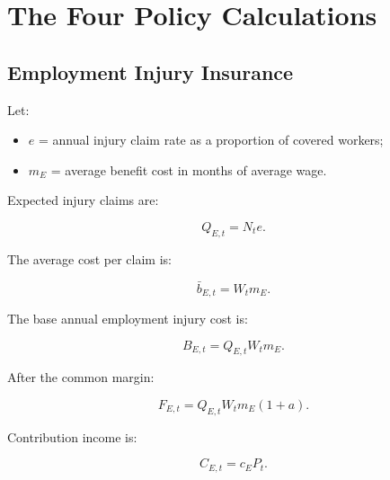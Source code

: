 \section{The Four Policy Calculations}

\subsection{Employment Injury Insurance}


Let:

\begin{itemize}
  \item $e$ = annual injury claim rate as a proportion of covered workers;
  \item $m_E$ = average benefit cost in months of average wage.
\end{itemize}

Expected injury claims are:

\begin{equation}
Q_{E,t}=N_te.
\end{equation}

The average cost per claim is:

\begin{equation}
\bar{b}_{E,t}=W_tm_E.
\end{equation}

The base annual employment injury cost is:

\begin{equation}
B_{E,t}=Q_{E,t}W_tm_E.
\end{equation}

After the common margin:

\begin{equation}
F_{E,t}=Q_{E,t}W_tm_E(1+a).
\end{equation}

Contribution income is:

\begin{equation}
C_{E,t}=c_EP_t.
\end{equation}

